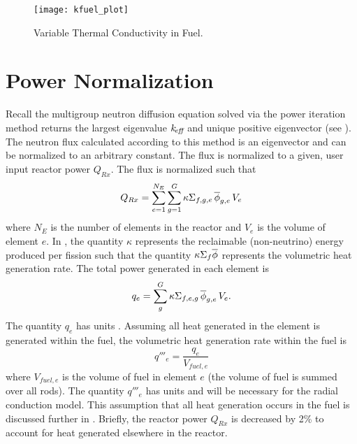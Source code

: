   \begin{figure}
    \centering
    \texttt{[image: kfuel\_plot]}
    \caption{Variable Thermal Conductivity in Fuel.}
    \label{fig:kfuel_plot}
  \end{figure}

\section{Power Normalization}
  Recall the multigroup neutron diffusion equation solved via the power
  iteration method returns the largest eigenvalue $k_{\!\mbox{\scriptsize \em eff}}$ and unique positive
  eigenvector (see ). The neutron flux calculated
  according to this method is an eigenvector and can be normalized to an
  arbitrary constant. The flux is normalized to a given, user input reactor
  power $Q_{Rx}$. The flux is normalized such that
  \begin{equation}
    \label{eq:normalization_phi}
    Q_{Rx} = \sum_{e=1}^{N_E} \sum_{g=1}^G \kappa \Sigma_{f,g,e} \, 
      \overline{\phi}_{g,e} \, V_e
  \end{equation}
  where $N_E$ is the number of elements in the reactor and $V_e$ is the volume
  of element $e$. In , the quantity $\kappa$
  represents the reclaimable (non-neutrino) energy produced per fission such
  that the quantity $\kappa \Sigma_f \overline{\phi}$ represents the volumetric heat
  generation rate.
  The total power generated in each element is 
  \begin{equation}
    \label{eq:elementpwr}
    q_{e} = \sum_g^G \kappa \Sigma_{f,e,g} \, \overline{\phi}_{g,e} \, V_e .
  \end{equation}
  The quantity $q_e$ has units . Assuming all heat generated in the
  element is generated within the fuel, the volumetric heat generation rate 
  within the fuel is 
  \begin{equation}
    \label{eq:elementqppp_fuel}
    q'''_{e} = \frac{q_e}{V_{fuel,e}}
  \end{equation}
  where $V_{fuel,e}$ is the volume of fuel in element $e$ (the volume of fuel is
  summed over all rods). The quantity $q'''_e$ has units
   and will be necessary for the radial
  conduction model. This assumption that all heat generation occurs in the fuel
  is discussed further in . Briefly, the
  reactor power $Q_{Rx}$ is decreased by 2\% to account for heat generated
  elsewhere in the reactor. 

